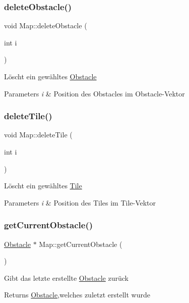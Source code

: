 \subsubsection{\texorpdfstring{delete\+Obstacle()}{deleteObstacle()}}
{\footnotesize\ttfamily void Map\+::delete\+Obstacle (\begin{DoxyParamCaption}\item[{int}]{i }\end{DoxyParamCaption})}

Löscht ein gewähltes \mbox{\hyperlink{class_obstacle}{Obstacle}} 
\begin{DoxyParams}{Parameters}
{\em i} & Position des Obstacles im Obstacle-\/\+Vektor \\
\hline
\end{DoxyParams}
\mbox{\label{class_map_aa220ee8afb6eb77ae41d137d44919173}} 
\subsubsection{\texorpdfstring{delete\+Tile()}{deleteTile()}}
{\footnotesize\ttfamily void Map\+::delete\+Tile (\begin{DoxyParamCaption}\item[{int}]{i }\end{DoxyParamCaption})}

Löscht ein gewähltes \mbox{\hyperlink{class_tile}{Tile}} 
\begin{DoxyParams}{Parameters}
{\em i} & Position des Tiles im Tile-\/\+Vektor \\
\hline
\end{DoxyParams}
\mbox{\label{class_map_a61b2390d5a19071bf3509152872f5ac6}} 
\subsubsection{\texorpdfstring{get\+Current\+Obstacle()}{getCurrentObstacle()}}
{\footnotesize\ttfamily \mbox{\hyperlink{class_obstacle}{Obstacle}} $\ast$ Map\+::get\+Current\+Obstacle (\begin{DoxyParamCaption}{ }\end{DoxyParamCaption})}

Gibt das letzte erstellte \mbox{\hyperlink{class_obstacle}{Obstacle}} zurück \begin{DoxyReturn}{Returns}
\mbox{\hyperlink{class_obstacle}{Obstacle}},welches zuletzt erstellt wurde 
\end{DoxyReturn}
\mbox{\label{class_map_aa84b261dd360a64ef6fadfb4c4b1f2ff}} 
